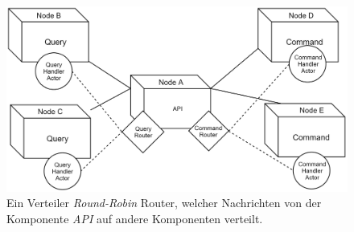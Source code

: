 \begin{figure}
    \centering
    \includegraphics[width=\linewidth]{gfx/implementation/ClusterRouter}
    \caption{Ein Verteiler \textit{Round-Robin} Router, welcher Nachrichten von der Komponente \textit{API} auf andere Komponenten verteilt.}
    \label{fig:implementation:routing}
\end{figure} 

